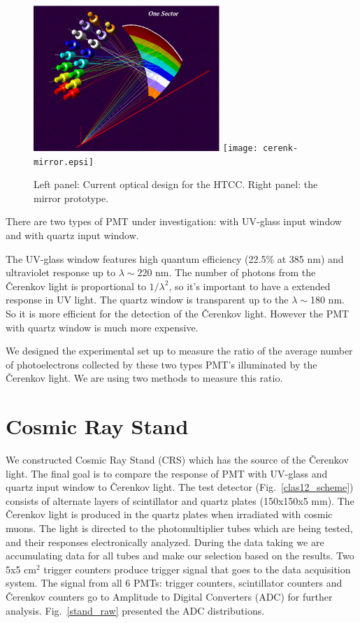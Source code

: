 \documentclass[11pt,titlepage]{article}
\begin{document}
 \begin{figure}
\hspace{0.5cm}
 \begin{centering}
  \includegraphics[height=5.5cm]{CLAS12-optics.eps}
 \texttt{[image: cerenk-mirror.epsi]}
 \hspace{0.1cm}

 \caption{\label{clas12_mirror}
Left panel: Current optical design for the HTCC. Right panel: the mirror prototype.
 }
 \end{centering}
 \end{figure}

There are two types of PMT under investigation: with UV-glass input window
and with quartz input window.

The UV-glass window features high quantum efficiency (22.5\% at 385 nm) and 
ultraviolet response up to $\lambda\sim$220 nm. The number of photons from the 
\v Cerenkov light is proportional to $1/\lambda^2$, so it's important to have 
a extended response in UV light. The quartz window is transparent up to the 
$\lambda\sim$180 nm. So it is more efficient for the detection of the \v Cerenkov light.
However the PMT with quartz window is much more expensive.

We designed the experimental set up to measure 
the ratio of the average number of photoelectrons
collected by these two types PMT's illuminated by the \v Cerenkov light. We are using two methods to
measure this ratio.

\section{Cosmic Ray Stand}

\noindent

We constructed Cosmic Ray Stand (CRS) which has the source of the \v Cerenkov light.
The final goal is to compare the response of PMT with UV-glass and quartz input window 
to \v Cerenkov light.
The test detector (Fig.~\ref{clas12_scheme}) consists of alternate layers of scintillator and quartz plates
(150x150x5 mm). The \v Cerenkov 
light is produced in the quartz plates
when irradiated with cosmic muons. The light is directed to the photomultiplier
tubes which are being tested, and their responses electronically analyzed. During the 
data taking we are accumulating data for all tubes and make our selection
based on the results. 
Two 5x5 cm$^2$ trigger counters produce trigger signal that goes to the data acquisition system.
The signal from all 6 PMTs: trigger counters, scintillator counters and 
\v Cerenkov counters go to Amplitude to Digital Converters (ADC) for further analysis.
Fig.~\ref{stand_raw} presented the ADC distributions. 
\end{document}
